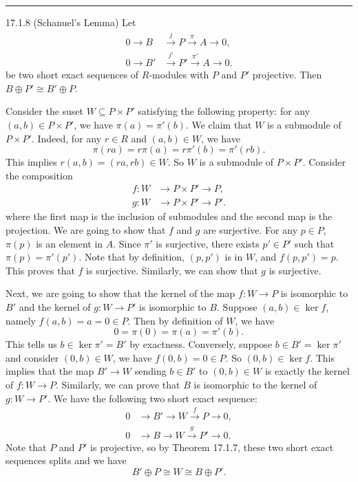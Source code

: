 \documentclass[a4paper, 12pt]{article}
\begin{document}
\noindent\rule{7in}{2.8pt}
\begin{problem}{17.1.8 (Schanuel's Lemma)}
Let 
\begin{align*}
    0\rightarrow B&\xrightarrow{j} P\xrightarrow{\pi} A\rightarrow 0,\\
    0\rightarrow B'&\xrightarrow{j'} P'\xrightarrow{\pi'} A\rightarrow 0.
\end{align*}
be two short exact sequences of \(R\)-modules with \(P\) and \(P'\) projective. Then \(B\oplus P'\cong B'\oplus P\).
\end{problem}
\begin{solution}
Consider the suset \(W\subseteq P\times P'\) satisfying the following property: for any \((a,b)\in P\times P'\), we have \(\pi(a)=\pi'(b)\). We claim that \(W\) is a submodule of \(P\times P'\). Indeed, for 
any \(r\in R\) and \((a,b)\in W\), we have 
\[\pi(ra)=r\pi(a)=r\pi'(b)=\pi'(rb).\]
This implies \(r(a,b)=(ra,rb)\in W\). So \(W\) is a submodule of \(P\times P'\). Consider the composition 
\begin{align*}
    f:W&\rightarrow P\times P'\rightarrow P,\\ 
    g:W&\rightarrow P\times P'\rightarrow P'.
\end{align*}
where the first map is the inclusion of submodules and the second map is the projection. We are going to show that \(f\) and \(g\) are surjective. For any \(p\in P\), \(\pi(p)\) is an element in \(A\). Since \(\pi'\) is surjective, 
there exists \(p'\in P'\) such that \(\pi(p)=\pi'(p')\). Note that by definition, \((p,p')\) is in \(W\), and \(f(p,p')=p\). This proves that \(f\) is surjective. Similarly, we can show that \(g\) is surjective. 

Next, we are going to show that the kernel of the map \(f:W\rightarrow P\) is isomorphic to \(B'\) and the kernel of \(g:W\rightarrow P'\) is isomorphic to \(B\). Suppose \((a,b)\in \ker f\), namely \(f(a,b)=a=0\in P\). Then by definition of \(W\), we have 
\[0=\pi(0)=\pi(a)=\pi'(b).\]
This tells us \(b\in \ker \pi'=B'\) by exactness. Conversely, suppose \(b\in B'=\ker \pi'\) and consider \((0,b)\in W\), we have \(f(0,b)=0\in P\). So \((0,b)\in \ker f\).
This implies that the map \(B'\rightarrow W\) sending \(b\in B'\) to \((0,b)\in W\) is exactly the kernel of \(f:W\rightarrow P\). Similarly, we can prove that \(B\) is isomorphic to the kernel of \(g:W\rightarrow P'\). We have the following two 
short exact sequence:
\begin{align*}
    0&\rightarrow B'\rightarrow W\xrightarrow{f}P\rightarrow 0,\\ 
    0&\rightarrow B\rightarrow W\xrightarrow{g}P'\rightarrow 0.
\end{align*}
Note that \(P\) and \(P'\) is projective, so by Theorem 17.1.7, these two short exact sequences splits and we have 
\[B'\oplus P\cong W\cong B\oplus P'.\]
\end{solution}
\end{document}
